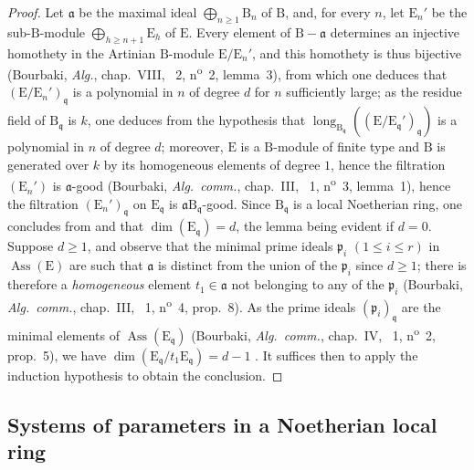 \begin{proof}
Let $\mathfrak{a}$ be the maximal ideal $\bigoplus_{n\geq 1}\mathrm{B}_n$ of $\mathrm{B}$, and, for every $n$, let $\mathrm{E}_n'$ be the sub-$\mathrm{B}$-module $\bigoplus_{h\geq n+1}\mathrm{E}_h$ of $\mathrm{E}$.
Every element of $\mathrm{B}-\mathfrak{a}$ determines an injective homothety in the Artinian $\mathrm{B}$-module $\mathrm{E}/\mathrm{E}_n'$, and this homothety is thus bijective (Bourbaki, \emph{Alg.}, chap.~VIII, \textsection~2, n\textsuperscript{o}~2, lemma~3), from which one deduces that $(\mathrm{E}/\mathrm{E}_n')_\mathfrak{q}$ is a polynomial in $n$ of degree $d$ for $n$ sufficiently large; as the residue field of $\mathrm{B}_\mathfrak{q}$ is $k$, one deduces from the hypothesis that $\operatorname{long}_{\mathrm{B}_\mathfrak{q}}((\mathrm{E}/\mathrm{E}_\mathfrak{q}')_\mathfrak{q})$ is a polynomial in $n$ of degree $d$; moreover, $\mathrm{E}$ is a $\mathrm{B}$-module of finite type and $\mathrm{B}$ is generated over $k$ by its homogeneous elements of degree $1$, hence the filtration $(\mathrm{E}_n')$ is $\mathfrak{a}$-good (Bourbaki, \emph{Alg.~comm.}, chap.~III, \textsection~1, n\textsuperscript{o}~3, lemma~1), hence the filtration $(\mathrm{E}_n')_\mathfrak{q}$ on $\mathrm{E}_\mathfrak{q}$ is $\mathfrak{a}\mathrm{B}_\mathfrak{q}$-good.
Since $\mathrm{B}_\mathfrak{q}$ is a local Noetherian ring, one concludes from  and  that $\dim(\mathrm{E}_\mathfrak{q})=d$, the lemma being evident if $d=0$.
Suppose $d\geq 1$, and observe that the minimal prime ideals $\mathfrak{p}_i$ $(1\leq i\leq r)$ in $\operatorname{Ass}(\mathrm{E})$ are such that $\mathfrak{a}$ is distinct from the union of the $\mathfrak{p}_i$ since $d\geq 1$; there is therefore a \emph{homogeneous} element $t_1\in\mathfrak{a}$ not belonging to any of the $\mathfrak{p}_i$ (Bourbaki, \emph{Alg.~comm.}, chap.~III, \textsection~1, n\textsuperscript{o}~4, prop.~8).
As the prime ideals $(\mathfrak{p}_i)_\mathfrak{q}$ are the minimal elements of $\operatorname{Ass}(\mathrm{E}_\mathfrak{q})$ (Bourbaki, \emph{Alg.~comm.}, chap.~IV, \textsection~1, n\textsuperscript{o}~2, prop.~5), we have $\dim(\mathrm{E}_\mathfrak{q}/t_1\mathrm{E}_\mathfrak{q})=d-1$ .
It suffices then to apply the induction hypothesis to obtain the conclusion.
\end{proof}

\subsection{Systems of parameters in a Noetherian local ring}
\label{subsection:0.16.3}

